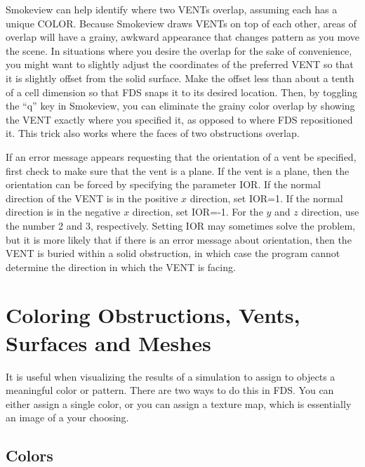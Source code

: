 \documentclass[11pt]{book}
\begin{document}
Smokeview can help identify where two {\ct VENT}s overlap, assuming each has a unique {\ct COLOR}. Because Smokeview draws {\ct VENT}s
on top of each other, areas of overlap will have a grainy, awkward appearance that changes pattern as you move the scene. In situations
where you desire the overlap for the sake of convenience, you might want to slightly adjust the coordinates of the preferred {\ct VENT}
so that it is slightly offset from the solid surface. Make the offset less than about a tenth of a cell dimension so that FDS snaps it
to its desired location. Then, by toggling the ``q'' key in Smokeview, you can eliminate the grainy color overlap by showing the
{\ct VENT} exactly where you specified it, as opposed to where FDS repositioned it. This trick also works where the faces of two
obstructions overlap.

If an error message appears requesting that
the orientation of a vent be specified, first check to make sure that the vent is a plane.
If the vent is a plane, then the orientation can be forced by specifying the parameter {\ct IOR}.
If the normal direction of the {\ct VENT} is in the positive $x$ direction, set {\ct IOR=1}.
If the normal direction is in the negative $x$ direction, set {\ct IOR=-1}. For the $y$ and
$z$ direction, use the number 2 and 3, respectively. Setting {\ct IOR} may sometimes solve
the problem, but it is more likely that if there is an error message about orientation, then
the {\ct VENT} is buried within a solid obstruction, in which case the program cannot determine
the direction in which the {\ct VENT} is facing.



\section{Coloring Obstructions, Vents, Surfaces and Meshes}
\label{info:colors}

It is useful when visualizing the results of a simulation to assign to objects a meaningful color or pattern. There are two ways to do this in FDS. You can either assign a single color, or you can assign a texture map, which is essentially an image of a your choosing.

\subsection{Colors}
\end{document}
